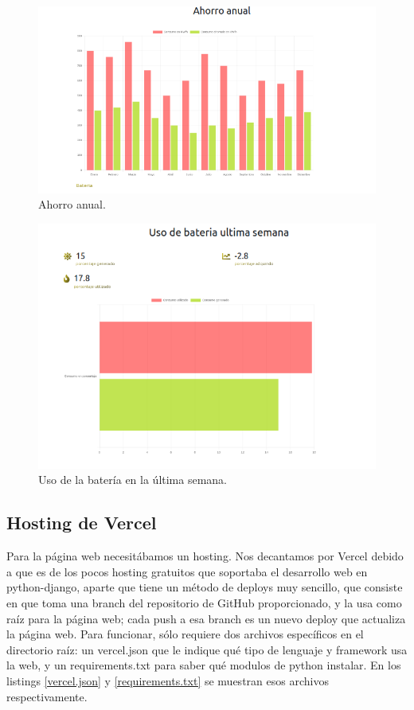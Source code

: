 \begin{figure}[H]
    \centering
    \includegraphics[width=1\linewidth]{web/Captura desde 2023-10-16 21-31-11.png}
    \caption{Ahorro anual.}
    \label{fig:enter-label}
\end{figure}

\begin{figure}[H]
    \centering
    \includegraphics[width=0.75\linewidth]{web/Captura desde 2023-10-16 21-31-23.png}
    \caption{Uso de la batería en la última semana.}
    \label{fig:enter-label}
\end{figure}

\subsection{Hosting de Vercel}
Para la página web necesitábamos un hosting. Nos decantamos por Vercel debido a que es de los pocos hosting gratuitos que soportaba el desarrollo web en python-django, aparte que tiene un método de deploys muy sencillo, que consiste en que toma una branch del repositorio de GitHub proporcionado, y la usa como raíz para la página web; cada push a esa branch es un nuevo deploy que actualiza la página web. Para funcionar, sólo requiere dos archivos específicos en el directorio raíz: un vercel.json que le indique qué tipo de lenguaje y framework usa la web, y un requirements.txt para saber qué modulos de python instalar. En los listings \ref{vercel.json} y \ref{requirements.txt} se muestran esos archivos respectivamente.

